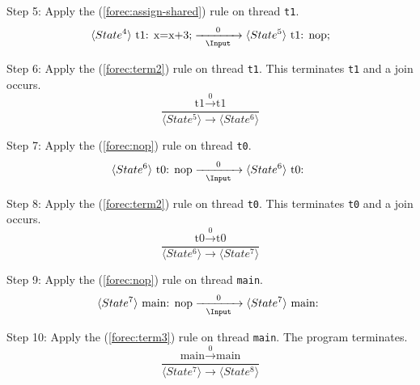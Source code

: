 \noindent
Step 5: Apply the (\ref{forec:assign-shared}) rule on thread \verb$t1$.
\begin{equation*}
	\langle State^4 \rangle ~ \text{t1: x=x+3;}
		\xrightarrow[~~\Input~~]{0} 
	\langle State^5 \rangle ~ \text{t1: nop;}
\end{equation*}

\noindent
Step 6: Apply the (\ref{forec:term2}) rule on thread \verb$t1$.
This terminates \verb$t1$ and a join occurs.
\begin{equation*}
	\frac{
			\text{t1} \xrightarrow{~~0~~} \text{t1}
		}{
			\langle State^5 \rangle \xrightarrow{~~~~~} \langle State^6 \rangle
		}
\end{equation*}

\noindent
Step 7: Apply the (\ref{forec:nop}) rule on thread \verb$t0$.
\begin{equation*}
	\langle State^6 \rangle ~ \text{t0: nop}
		\xrightarrow[~~\Input~~]{0} 
	\langle State^6 \rangle ~ \text{t0: }
\end{equation*}

\noindent
Step 8: Apply the (\ref{forec:term2}) rule on thread \verb$t0$.
This terminates \verb$t0$ and a join occurs.
\begin{equation*}
	\frac{
			\text{t0} \xrightarrow{~~0~~} \text{t0}
		}{
			\langle State^6 \rangle \xrightarrow{~~~~~} \langle State^7 \rangle
		}
\end{equation*}

\noindent
Step 9: Apply the (\ref{forec:nop}) rule on thread \verb$main$.
\begin{equation*}
	\langle State^7 \rangle ~ \text{main: nop}
		\xrightarrow[~~\Input~~]{0} 
	\langle State^7 \rangle ~ \text{main: }
\end{equation*}

Step 10: Apply the (\ref{forec:term3}) rule on thread \verb$main$.
The program terminates.
\begin{equation*}
	\frac{
			\text{main} \xrightarrow{~~0~~} \text{main}
		}{
			\langle State^7 \rangle \xrightarrow{~~~~~} \langle State^8 \rangle
		}
\end{equation*}


